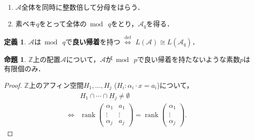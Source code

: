 \documentclass[xelatex,ja=standard,a4paper,14pt,everyparhook=compat]{bxjsarticle}
\newcommand{\bbZ}{\mathbb{Z}}
\newcommand{\mcA}{\mathcal{A}}
\newcommand{\umod}{{\bmod\:}}
\DeclareMathOperator{\rank}{rank}
\theoremstyle{definition}
\newtheorem{definition}[theorem]{定義}
\newtheorem{proposition}[theorem]{命題}
\begin{document}
\begin{enumerate}[label=(\arabic*)]
    \item $\mcA$全体を同時に整数倍して分母をはらう．
    \item 素ベキ$q$をとって全体の$\umod q$をとり，$\mcA_q$を得る．
\end{enumerate}

\begin{definition}
    $\mcA$は$\umod q$で\textbf{良い帰着}を持つ $\overset{\mathrm{def}}{\Longleftrightarrow}$ $L(\mcA) \cong L(\mcA_q)$．
\end{definition}

\begin{proposition}
    $\bbZ$上の配置$\mcA$について，$\mcA$が$\umod p$で良い帰着を持たないような素数$p$は有限個のみ．
\end{proposition}
\begin{proof}
    $\bbZ$上のアフィン空間$H_1,\ldots,H_j$ ($H_i : \alpha_i \cdot x = a_i$)について， \begin{align*}
        & H_1 \cap \cdots \cap H_j \neq \emptyset \\
        \Longleftrightarrow{}& \rank\begin{pmatrix}
            \alpha_1 & a_1 \\
            \vdots & \vdots \\
            \alpha_j & a_j
        \end{pmatrix} = \rank \begin{pmatrix}
            \alpha_1 \\
            \vdots \\
            \alpha_j
        \end{pmatrix}.
    \end{align*}
\end{proof}
\end{document}
